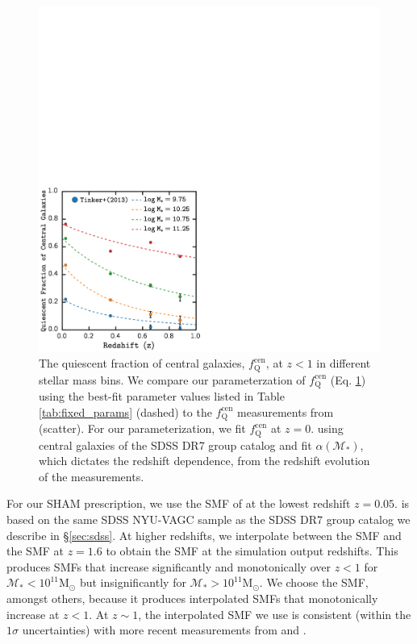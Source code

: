 \documentclass[iop,apj,tighten,twocolappendix,numberedappendix]{emulateapj}
\newcommand{\fqcen}{f_\mathrm{Q}^\mathrm{cen}}
\begin{document}
\begin{figure}
\begin{center}
\includegraphics[scale=0.45]{figs/fqcen.pdf}
\caption{The quiescent fraction of central galaxies, $\fqcen$, 
at $z < 1$ in different stellar mass bins. We compare our 
parameterzation of $\fqcen$ (Eq. \ref{fig:fqcen}) using the 
best-fit parameter values listed in Table \ref{tab:fixed_params} (dashed) 
to the $\fqcen$ measurements from \cite{Tinker:2013aa} (scatter). 
For our parameterization, we fit $\fqcen$ at $z = 0.$ using central 
galaxies of the SDSS DR7 group catalog and fit $\alpha(\mathcal{M}_*)$, 
which dictates the redshift dependence, from the redshift evolution  
of the \cite{Tinker:2013aa} measurements.}
\label{fig:fqcen}
\end{center}
\end{figure}

For our SHAM prescription, we use the SMF of \cite{Li:2009aa} at the 
lowest redshift $z = 0.05$. \cite{Li:2009aa} is based on the same 
SDSS NYU-VAGC sample as the SDSS DR7 group catalog we describe in 
\S \ref{sec:sdss}. At higher redshifts, we interpolate between the 
\cite{Li:2009aa} SMF and the \cite{Marchesini:2009aa} SMF at $z = 1.6$ 
to obtain the SMF at the simulation output redshifts. This produces 
SMFs that increase significantly and monotonically over $z < 1$ for 
$\mathcal{M}_* < 10^{11} \mathrm{M}_\odot$ but insignificantly for 
$\mathcal{M}_* > 10^{11} \mathrm{M}_\odot$. 
We choose the \cite{Marchesini:2009aa} SMF, amongst others, because 
it produces interpolated SMFs that monotonically increase at $z < 1$. 
At $z \sim 1$, the interpolated SMF we use is consistent (within 
the $1\sigma$ uncertainties) with more recent measurements from 
\cite{Muzzin:2013aa} and \cite{Ilbert:2013aa}. 
\end{document}

